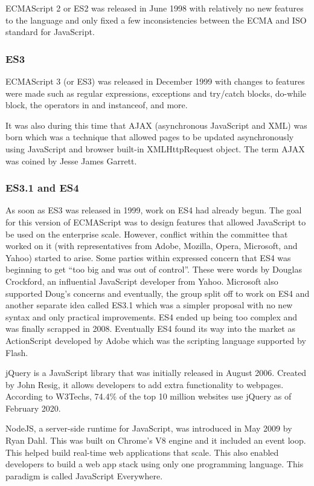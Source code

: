 \documentclass{article}
\begin{document}
  ECMAScript 2 or ES2 was released in June 1998 with relatively no new features
  to the language and only fixed a few inconsistencies between the ECMA and ISO
  standard for JavaScript.

  \subsubsection{ES3}
  ECMAScript 3 (or ES3) was released in December 1999 with changes to features
  were made such as regular expressions, exceptions and try/catch blocks,
  do-while block, the operators in and instanceof, and more.

  It was also during this time that AJAX (asynchronous JavaScript and XML) was
  born which was a technique that allowed pages to be updated asynchronously
  using JavaScript and browser built-in XMLHttpRequest object. The term AJAX was
  coined by Jesse James Garrett.

  \subsubsection{ES3.1 and ES4}
  As soon as ES3 was released in 1999, work on ES4 had already begun. The goal
  for this version of ECMAScript was to design features that allowed JavaScript
  to be used on the enterprise scale. However, conflict within the committee
  that worked on it (with representatives from Adobe, Mozilla, Opera, Microsoft,
  and Yahoo) started to arise. Some parties within expressed concern that ES4
  was beginning to get “too big and was out of control”. These were words by
  Douglas Crockford, an influential JavaScript developer from Yahoo. Microsoft
  also supported Doug’s concerns and eventually, the group split off to work on
  ES4 and another separate idea called ES3.1 which was a simpler proposal with
  no new syntax and only practical improvements. ES4 ended up being too complex
  and was finally scrapped in 2008. Eventually ES4 found its way into the market
  as ActionScript developed by Adobe which was the scripting language supported
  by Flash.

  jQuery is a JavaScript library that was initially released in August 2006.
  Created by John Resig, it allows developers to add extra functionality to
  webpages. According to W3Techs, 74.4\% of the top 10 million websites use
  jQuery as of February 2020.

  NodeJS, a server-side runtime for JavaScript, was introduced in May 2009 by
  Ryan Dahl. This was built on Chrome’s V8 engine and it included an event loop.
  This helped build real-time web applications that scale. This also enabled
  developers to build a web app stack using only one programming language. This
  paradigm is called JavaScript Everywhere.
\end{document}
